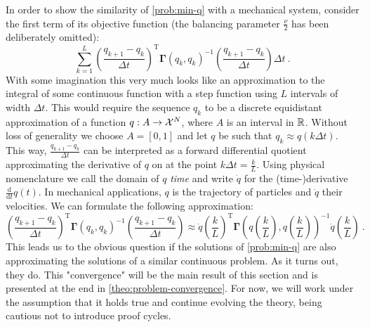 In order to show the similarity of \cref{prob:min-q} with a mechanical system, consider the first term of its objective function (the balancing parameter $\frac{\nu}{2}$ has been deliberately omitted):
\begin{equation}
	\label{eq:discrete-lagrangian}
	\sum_{k=1}^{L} \left(\frac{q_{k+1} - q_k}{\Delta t}\right)^\mathrm{T} \mathbf{\Gamma}(q_k, q_k)^{-1} \left(\frac{q_{k+1} - q_k}{\Delta t}\right) \Delta t \ .
\end{equation}
With some imagination this very much looks like an approximation to the integral of some continuous function with a step function using $L$ intervals of width $\Delta t$.
This would require the sequence $q_k$ to be a discrete equidistant approximation of a function $q: A \rightarrow \mathcal{X}^N$, where $A$ is an interval in $\mathbb{R}$.
Without loss of generality we choose $A = [0, 1]$ and let $q$ be such that $q_k \approx q(k \Delta t)$.
This way, $\frac{q_{k+1} - q_k}{\Delta t}$ can be interpreted as a forward differential quotient approximating the derivative of $q$ on at the point $k \Delta t = \frac{k}{L}$.
Using physical nomenclature we call the domain of $q$ \emph{time} and write $\dot{q}$ for the (time-)derivative $\frac{\mathrm{d}}{\mathrm{d}t}q(t)$.
In mechanical applications, $q$ is the trajectory of particles and $\dot{q}$ their velocities.
We can formulate the following approximation:
\begin{equation}
	\left(\frac{q_{k+1} - q_k}{\Delta t}\right)^\mathrm{T} \mathbf{\Gamma}(q_k, q_k)^{-1} \left(\frac{q_{k+1} - q_k}{\Delta t}\right)
	\approx \dot{q}\left(\frac{k}{L}\right)^\mathrm{T} \mathbf{\Gamma}\left(q\left(\frac{k}{L}\right), q\left(\frac{k}{L}\right)\right)^{-1}\dot{q}\left(\frac{k}{L}\right) \ .
\end{equation}
This leads us to the obvious question if the solutions of \cref{prob:min-q} are also approximating the solutions of a similar continuous problem.
As it turns out, they do.
This "convergence" will be the main result of this section and is presented at the end in \cref{theo:problem-convergence}.
For now, we will work under the assumption that it holds true and continue evolving the theory, being cautious not to introduce proof cycles.

